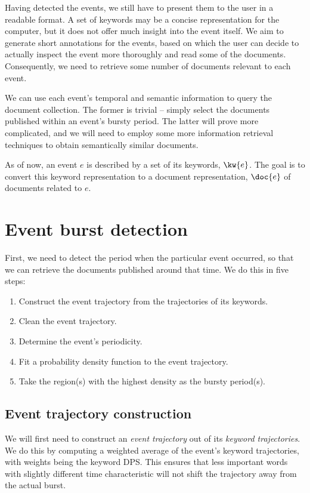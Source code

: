 Having detected the events, we still have to present them to the user in a readable format. A set of keywords may be a concise representation for the computer, but it does not offer much insight into the event itself. We aim to generate short annotations for the events, based on which the user can decide to actually inspect the event more thoroughly and read some of the documents. Consequently, we need to retrieve some number of documents relevant to each event.

We can use each event's temporal and semantic information to query the document collection. The former is trivial -- simply select the documents published within an event's bursty period. The latter will prove more complicated, and we will need to employ some more information retrieval techniques to obtain semantically similar documents.

As of now, an event $e$ is described by a set of its keywords, $\kw{e}$. The goal is to convert this keyword representation to a document representation, $\doc{e}$ of documents related to $e$.

\section{Event burst detection}
First, we need to detect the period when the particular event occurred, so that we can retrieve the documents published around that time. We do this in five steps:

\begin{enumerate}
	\item Construct the event trajectory from the trajectories of its keywords.
	\item Clean the event trajectory.
	\item Determine the event's periodicity.
	\item Fit a probability density function to the event trajectory.
	\item Take the region(s) with the highest density as the bursty period(s).
\end{enumerate}


\subsection{Event trajectory construction}
We will first need to construct an \textit{event trajectory} out of its \textit{keyword trajectories}. We do this by computing a weighted average of the event's keyword trajectories, with weights being the keyword DPS. This ensures that less important words with slightly different time characteristic will not shift the trajectory away from the actual burst.

